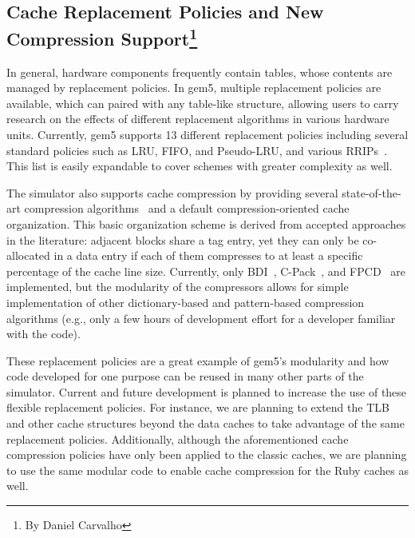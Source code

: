 \subsection[Cache Replacement Policies and New Compression Support]{Cache Replacement Policies and New Compression Support\footnote{By Daniel Carvalho}}

In general, hardware components frequently contain tables, whose contents are managed by replacement policies.
In gem5, multiple replacement policies are available, which can paired with any table-like structure, allowing users to carry research on the effects of different replacement algorithms in various hardware units.
Currently, gem5 supports 13 different replacement policies including several standard policies such as LRU, FIFO, and Pseudo-LRU, and various RRIPs~\cite{Jaleel2010rrip}.
This list is easily expandable to cover schemes with greater complexity as well.

The simulator also supports cache compression by providing several state-of-the-art compression algorithms~\cite{sardashti2015primer} and a default compression-oriented cache organization.
This basic organization scheme is derived from accepted approaches in the literature: adjacent blocks share a tag entry, yet they can only be co-allocated in a data entry if each of them compresses to at least a specific percentage of the cache line size.
Currently, only BDI~\cite{pekhimenko2012base}, C-Pack~\cite{chen2010c}, and FPCD~\cite{alameldeen2018opportunistic} are implemented, but the modularity of the compressors allows for simple implementation of other dictionary-based and pattern-based compression algorithms (e.g., only a few hours of development effort for a developer familiar with the code).

These replacement policies are a great example of gem5's modularity and how code developed for one purpose can be reused in many other parts of the simulator.
Current and future development is planned to increase the use of these flexible replacement policies.
For instance, we are planning to extend the TLB and other cache structures beyond the data caches to take advantage of the same replacement policies.
Additionally, although the aforementioned cache compression policies have only been applied to the classic caches, we are planning to use the same modular code to enable cache compression for the Ruby caches as well.
